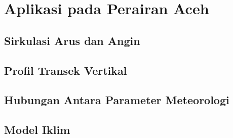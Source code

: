 \section[Aplikasi pada Perairan Aceh]{Aplikasi pada Perairan Aceh}
\begin{spacing}{1.5}
	\vspace{-1pc}
	\subsection[Sirkulasi Arus dan Angin]{Sirkulasi Arus dan Angin}
	
	\lipsum[1]
	
	\subsection[Profil Transek Vertikal]{Profil Transek Vertikal}
	
	\lipsum[1]
	
	\subsection[Hubungan Antara Parameter Meteorologi]{Hubungan Antara Parameter Meteorologi}
	
	\lipsum[1]
	
	
	\subsection[Model Iklim]{Model Iklim}
	
	\lipsum[1]
	
\end{spacing}